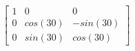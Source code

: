 \documentclass[preview]{standalone}
\begin{document}
\begin{align*}
\left[ \begin{array}{ccc}1 & 0 & 0 \\ 0 & cos(30) & -sin(30) \\ 0 & sin(30) & cos(30)\end{array} \right]
\end{align*}
\end{document}
